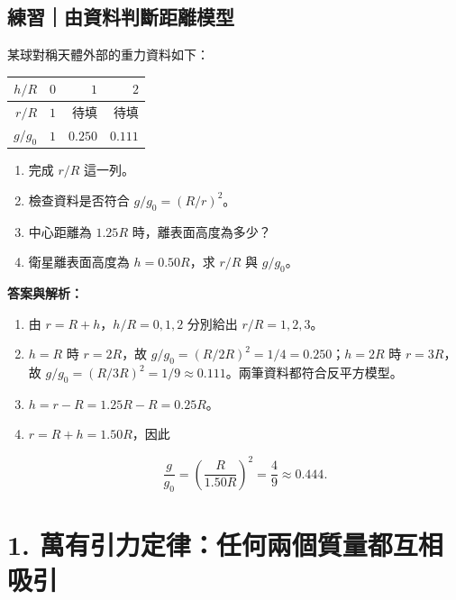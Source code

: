 \documentclass[11pt,a4paper]{article}
\newcounter{none}
\providecommand{\tightlist}{%
  \setlength{\itemsep}{0pt}\setlength{\parskip}{0pt}}
\begin{document}
\begin{HandoutSelfCheck}

\subsection{練習｜由資料判斷距離模型}\label{ux7df4ux7fd2ux7531ux8cc7ux6599ux5224ux65b7ux8dddux96e2ux6a21ux578b}

某球對稱天體外部的重力資料如下：

{\def\LTcaptype{none} %
\begin{longtable}[]{@{}rrrr@{}}
\toprule\noalign{}
\(h/R\) & \(0\) & \(1\) & \(2\) \\
\midrule\noalign{}
\endhead
\bottomrule\noalign{}
\endlastfoot
\(r/R\) & \(1\) & \(\text{待填}\) & \(\text{待填}\) \\
\(g/g_0\) & \(1\) & \(0.250\) & \(0.111\) \\
\end{longtable}
}

\begin{enumerate}
\def\labelenumi{\arabic{enumi}.}
\tightlist
\item
  完成 \(r/R\) 這一列。
\item
  檢查資料是否符合 \(g/g_0=(R/r)^2\)。
\item
  中心距離為 \(1.25R\) 時，離表面高度為多少？
\item
  衛星離表面高度為 \(h=0.50R\)，求 \(r/R\) 與 \(g/g_0\)。
\end{enumerate}

\textbf{答案與解析：}

\begin{enumerate}
\def\labelenumi{\arabic{enumi}.}
\item
  由 \(r=R+h\)，\(h/R=0,1,2\) 分別給出 \(r/R=1,2,3\)。
\item
  \(h=R\) 時 \(r=2R\)，故 \(g/g_0=(R/2R)^2=1/4=0.250\)；\(h=2R\) 時 \(r=3R\)，故 \(g/g_0=(R/3R)^2=1/9\approx0.111\)。兩筆資料都符合反平方模型。
\item
  \(h=r-R=1.25R-R=0.25R\)。
\item
  \(r=R+h=1.50R\)，因此

  \[
  \frac{g}{g_0}=\left(\frac{R}{1.50R}\right)^2
  =\frac49\approx0.444.
  \]
\end{enumerate}

\end{HandoutSelfCheck}

\section{1. 萬有引力定律：任何兩個質量都互相吸引}\label{ux842cux6709ux5f15ux529bux5b9aux5f8bux4efbux4f55ux5169ux500bux8ceaux91cfux90fdux4e92ux76f8ux5438ux5f15}
\end{document}
